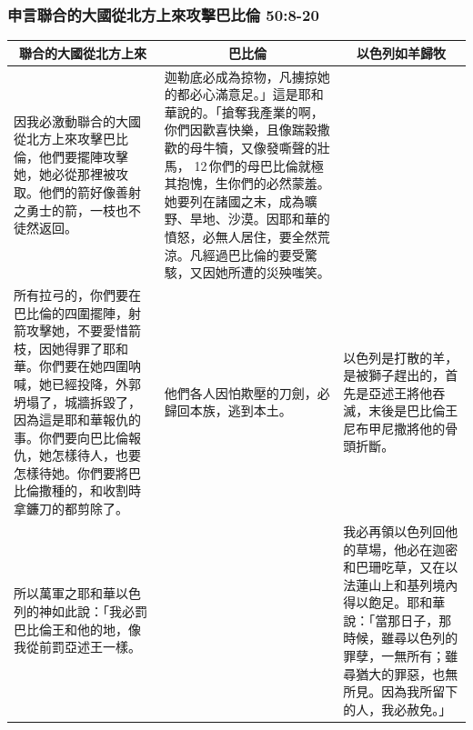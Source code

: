 \subsubsection{申言聯合的大國從北方上來攻擊巴比倫 50:8-20}
\begin{table}[H]
\centering
\begin{tabular}{p{5.75cm}|p{5.50cm}|p{5.50cm}}\hline\hline
\multicolumn{1}{c|}{聯合的大國從北方上來}&\multicolumn{1}{c|}{巴比倫}&\multicolumn{1}{c}{以色列如羊歸牧}\\\hline
因我必激動聯合的大國從北方上來攻擊巴比倫，他們要擺陣攻擊她，她必從那裡被攻取。他們的箭好像善射之勇士的箭，一枝也不徒然返回。 
&迦勒底必成為掠物，凡擄掠她的都必心滿意足。」這是耶和華說的。「搶奪我產業的啊，你們因歡喜快樂，且像踹穀撒歡的母牛犢，又像發嘶聲的壯馬， 12 你們的母巴比倫就極其抱愧，生你們的必然蒙羞。她要列在諸國之末，成為曠野、旱地、沙漠。因耶和華的憤怒，必無人居住，要全然荒涼。凡經過巴比倫的要受驚駭，又因她所遭的災殃嗤笑。
&\\\hline

所有拉弓的，你們要在巴比倫的四圍擺陣，射箭攻擊她，不要愛惜箭枝，因她得罪了耶和華。你們要在她四圍呐喊，她已經投降，外郭坍塌了，城牆拆毀了，因為這是耶和華報仇的事。你們要向巴比倫報仇，她怎樣待人，也要怎樣待她。你們要將巴比倫撒種的，和收割時拿鐮刀的都剪除了。
&他們各人因怕欺壓的刀劍，必歸回本族，逃到本土。
&以色列是打散的羊，是被獅子趕出的，首先是亞述王將他吞滅，末後是巴比倫王尼布甲尼撒將他的骨頭折斷。\\\hline

所以萬軍之耶和華以色列的神如此說：「我必罰巴比倫王和他的地，像我從前罰亞述王一樣。&
&我必再領以色列回他的草場，他必在迦密和巴珊吃草，又在以法蓮山上和基列境內得以飽足。耶和華說：「當那日子，那時候，雖尋以色列的罪孽，一無所有；雖尋猶大的罪惡，也無所見。因為我所留下的人，我必赦免。」\\\hline
\end{tabular}
\end{table}



